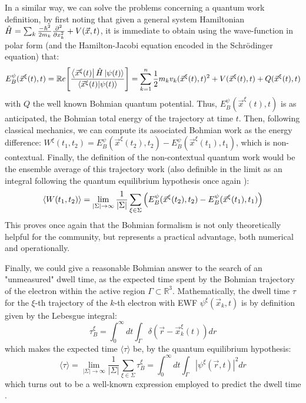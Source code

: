 \documentclass[11pt, a4paper]{article} %
\newcommand{\R}{\mathbb{R}} %
\begin{document}
In a similar way, we can solve the problems concerning a quantum work definition, by first noting that given a general system Hamiltonian $\hat{H}=\sum_k \frac{-\hbar^2}{2m_k}\pdv[2]{}{x_k}+V(\vec{x},t)$, it is immediate to obtain using the wave-function in polar form (and the Hamilton-Jacobi equation encoded in the Schrödinger equation) that:
\begin{equation}
E^\psi_B(\vec{x}^\xi(t),t) = \mathbb{R}e\qty[ \frac{\bra{\vec{x}^\xi(t)}\hat{H}\ket{\psi(t)}}{\bra{\vec{x}^\xi(t)}\ket{\psi(t)}} ] = \sum_{k=1}^n\frac{1}{2}m_kv_k(\vec{x}^\xi(t),t)^2+V(\vec{x}^\xi(t),t)+Q(\vec{x}^\xi(t),t)
\end{equation}
with $Q$ the well known Bohmian quantum potential. Thus, $E^\psi_B(\vec{x}^\xi(t),t)$ is as anticipated, the Bohmian total energy of the trajectory at time $t$. Then, following classical mechanics, we can compute its associated Bohmian work as the energy difference: $W^\xi(t_1,t_2)= E^\psi_B(\vec{x}^\xi(t_2),t_2)-E^\psi_B(\vec{x}^\xi(t_1),t_1)$, which is non-contextual. Finally, the definition of the non-contextual quantum work would be the ensemble average of this trajectory work (also definible in the limit as an integral following the quantum equilibrium hypothesis once again \cite{Absolute}):
\begin{equation}
\langle W(t_1,t_2)\rangle = \lim_{|\Sigma|\rightarrow \infty}\frac{1}{|\Sigma|} \sum_{\xi\in\Sigma} \qty(E^\psi_B(\vec{x}^\xi(t_2),t_2)-E^\psi_B(\vec{x}^\xi(t_1),t_1))
\end{equation}
This proves once again that the Bohmian formalism is not only theoretically helpful for the community, but represents a practical advantage, both numerical and operationally.

Finally, we could give a reasonable Bohmian answer to the search of an "unmeasured" dwell time, as the expected time spent by the Bohmian trajectory of the electron within the active region $\Gamma\subset \R^3$. Mathematically, the dwell time $\tau$ for the $\xi$-th trajectory of the $k$-th electron with EWF $\psi^\xi(\vec{x}_k,t)$ is by definition given by the Lebesgue integral:
\begin{equation}
\tau^\xi_B= \int_{0}^\infty  dt \int_\Gamma \delta(\vec{r}-\vec{x}_k^\xi(t)) dr
\end{equation}
which makes the expected time $\langle \tau\rangle$ be, by the quantum equilibrium hypothesis:
\begin{equation}
\langle \tau \rangle = \lim_{|\Sigma|\rightarrow \infty}\frac{1}{|\Sigma|} \sum_{\xi\in\Sigma} \tau_B^\xi = \int_{0}^\infty dt \int_\Gamma |\psi^\xi(\vec{r},t)|^2dr
\end{equation}
which turns out to be a well-known expression employed to predict the dwell time \cite{Tal}.
\end{document}
